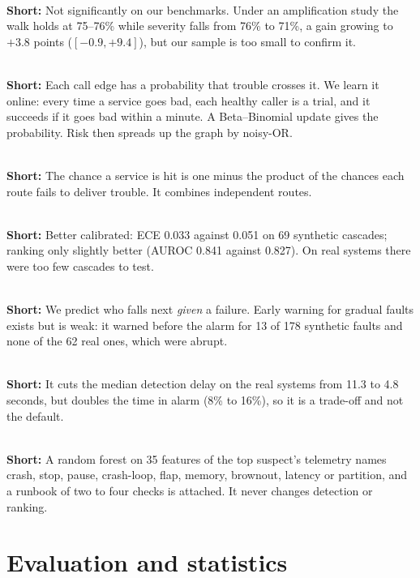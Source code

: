 \\
\textbf{Short:} Not significantly on our benchmarks. Under an amplification study the walk holds at 75--76\% while severity falls from 76\% to 71\%, a gain growing to $+3.8$ points ($[-0.9,+9.4]$), but our sample is too small to confirm it.

\\
\textbf{Short:} Each call edge has a probability that trouble crosses it. We learn it online: every time a service goes bad, each healthy caller is a trial, and it succeeds if it goes bad within a minute. A Beta--Binomial update gives the probability. Risk then spreads up the graph by noisy-OR.

\\
\textbf{Short:} The chance a service is hit is one minus the product of the chances each route fails to deliver trouble. It combines independent routes.

\\
\textbf{Short:} Better calibrated: ECE 0.033 against 0.051 on 69 synthetic cascades; ranking only slightly better (AUROC 0.841 against 0.827). On real systems there were too few cascades to test.

\\
\textbf{Short:} We predict who falls next \emph{given} a failure. Early warning for gradual faults exists but is weak: it warned before the alarm for 13 of 178 synthetic faults and none of the 62 real ones, which were abrupt.

\\
\textbf{Short:} It cuts the median detection delay on the real systems from 11.3 to 4.8 seconds, but doubles the time in alarm (8\% to 16\%), so it is a trade-off and not the default.

\\
\textbf{Short:} A random forest on 35 features of the top suspect's telemetry names crash, stop, pause, crash-loop, flap, memory, brownout, latency or partition, and a runbook of two to four checks is attached. It never changes detection or ranking.

\section{Evaluation and statistics}

